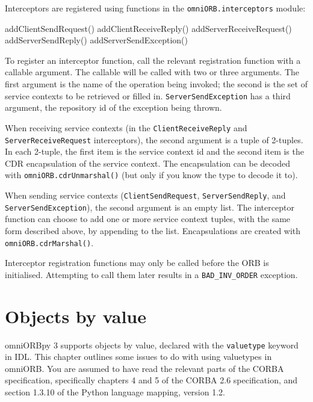 \documentclass[11pt,twoside,a4paper]{book}
\newcommand{\code}[1]{\texttt{#1}}
\newcommand{\op}[1]{\texttt{#1()}}
\newcommand{\dsc}{\discretionary{}{}{}}
\begin{document}
Interceptors are registered using functions in the
\code{omniORB.interceptors} module:

\begin{pylisting}
  addClientSendRequest()
  addClientReceiveReply()
  addServerReceiveRequest()
  addServerSendReply()
  addServerSendException()
\end{pylisting}

To register an interceptor function, call the relevant registration
function with a callable argument. The callable will be called with
two or three arguments. The first argument is the name of the
operation being invoked; the second is the set of service contexts to
be retrieved or filled in. \code{ServerSendException} has a third
argument, the repository id of the exception being thrown.

When receiving service contexts (in the \code{ClientReceiveReply} and
\code{Server\dsc{}ReceiveRequest} interceptors), the second argument
is a tuple of 2-tuples. In each 2-tuple, the first item is the service
context id and the second item is the CDR encapsulation of the service
context. The encapsulation can be decoded with
\op{omniORB.cdrUnmarshal} (but only if you know the type to decode it
to).

When sending service contexts (\code{ClientSendRequest},
\code{ServerSendReply}, and \code{ServerSendException}), the second
argument is an empty list. The interceptor function can choose to add
one or more service context tuples, with the same form described
above, by appending to the list.  Encapsulations are created with
\op{omniORB.cdrMarshal}.

Interceptor registration functions may only be called before the ORB
is initialised. Attempting to call them later results in a
\code{BAD\_INV\_ORDER} exception.





\chapter{Objects by value}
\label{chap:valuetype}

omniORBpy 3 supports objects by value, declared with the
\code{valuetype} keyword in IDL. This chapter outlines some issues to
do with using valuetypes in omniORB. You are assumed to have read the
relevant parts of the CORBA specification, specifically chapters 4 and
5 of the CORBA 2.6 specification, and section 1.3.10 of the Python
language mapping, version 1.2.
\end{document}
